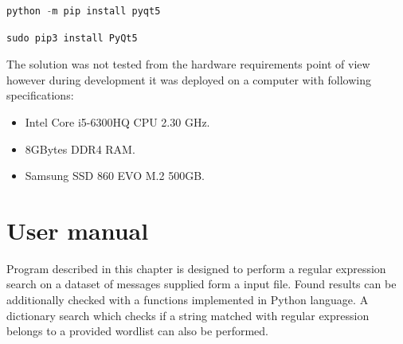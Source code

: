\documentclass[a4paper,twoside,12pt]{book}
\begin{document}
\begin{lstlisting}[float=!ht,language=C++,label=lst:windowsScript,caption={Windows installation script.},frame=lines,framexleftmargin=0.5em,captionpos=b,escapechar=^,texcl=true,breaklines=true]
python -m pip install pyqt5
\end{lstlisting}


\begin{lstlisting}[float=!ht,language=C,label=lst:linuxScript,caption={Linux installation script.},frame=lines,framexleftmargin=0.5em,captionpos=b,escapechar=^,texcl=true,breaklines=true]
sudo pip3 install PyQt5
\end{lstlisting}


The solution was not tested from the hardware requirements point of view however 
during development it was deployed on a computer with following specifications:

\begin{itemize}
   \item Intel Core i5-6300HQ CPU 2.30 GHz.
   \item 8GBytes DDR4 RAM.
   \item Samsung SSD 860 EVO M.2 500GB.
\end{itemize}


\section{User manual}

Program described in this chapter is designed to perform a regular expression search on a dataset of messages supplied form a input file. Found results can 
be additionally checked with a functions implemented in Python language. A dictionary search which checks if a string matched with regular expression belongs to a provided wordlist
can also be performed.
\end{document}
